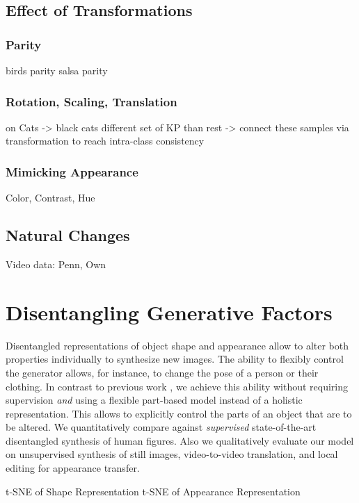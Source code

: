 	\subsection{Effect of Transformations}
		\subsubsection{Parity}
		birds parity
		salsa parity
		\subsubsection{Rotation, Scaling, Translation}
			on Cats -> black cats different set of KP than rest -> connect these samples via transformation to reach intra-class consistency
		\subsubsection{Mimicking Appearance}
		Color, Contrast, Hue
		\subsection{Natural Changes}
		Video data: Penn, Own
\section{Disentangling Generative Factors}
	Disentangled representations of object shape and appearance allow to alter both properties individually to synthesize new images. The ability to flexibly control the generator allows, for instance, to change the pose of a person or their clothing. In contrast to previous work \cite{esser18, denton17disvideo, ma17poseguided, ma17disperson, debem18dgpose, jakab18},
	we achieve this ability without requiring supervision \textit{and} using a flexible part-based model instead of a holistic representation. This allows to explicitly control the parts of an object that are to be altered. We quantitatively compare against \emph{supervised} state-of-the-art disentangled synthesis of human figures. Also we qualitatively evaluate our model on unsupervised synthesis of still images, video-to-video translation, and local editing for appearance transfer.


	t-SNE of Shape Representation
	t-SNE of Appearance Representation
